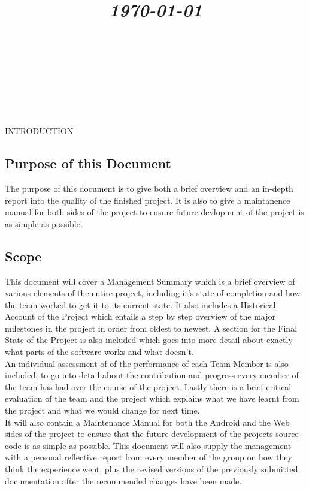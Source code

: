 \documentclass{article}
\title{
	\vspace{1.2in}
	\textmd{\textbf{\doctitle}} \\
	\vspace{0.1in}\large{\textit{\today}} \\
	\vspace{0.4in}
	{\bf{\qanumber}} \\ \vspace{0.4in}
	\version \\
	\status \\
	\vspace{0.4in}
}
\author{\authors}
\date{}
\begin{document}
	\maketitle
	\newpage
	\tableofcontents
	\newpage

	\begin{section}{INTRODUCTION}
		\subsection{Purpose of this Document}
		The purpose of this document is to give both a brief overview and an in-depth report into the quality of the finished project. It is also to give a maintanence manual for both sides of the project to ensure future devlopment of the project is as simple as possible.

		\subsection{Scope}
		This document will cover a Management Summary which is a brief overview of various elements of the entire project, including it's state of completion and how the team worked to get it to its current state. It also includes a Historical Account of the Project which entails a step by step overview of the major milestones in the project in order from oldest to newest. A section for the Final State of the Project is also included which goes into more detail about exactly what parts of the software works and what doesn't. \\
		
		An individual assessment of of the performance of each Team Member is also included, to go into detail about the contribution and progress every member of the team has had over the course of the project. Lastly there is a brief critical evaluation of the team and the project which explains what we have learnt from the project and what we would change for next time. \\
		
		It will also contain a Maintenance Manual for both the Android and the Web sides of the project to ensure that the future development of the projects source code is as simple as possible. This document will also supply the management with a personal reflective report from every member of the group on how they think the experience went, plus the revised versions of the previously submitted documentation after the recommended changes have been made.


\end{section}
\end{document}

